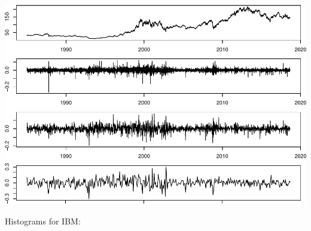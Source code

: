 \documentclass[11pt,]{article}
\begin{document}
\includegraphics{hw1_files/figure-latex/unnamed-chunk-6-1.pdf}

Histograms for IBM:
\end{document}
